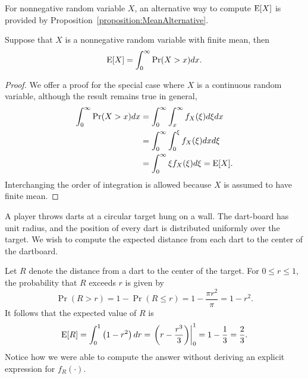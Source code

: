 For nonnegative random variable $X$, an alternative way to compute $\mathrm{E} [X]$ is provided by Proposition~\ref{proposition:MeanAlternative}. 

\begin{proposition} \label{proposition:MeanAlternative}
Suppose that $X$ is a nonnegative random variable with finite mean, then
\begin{equation*}
\mathrm{E} [X] = \int_0^{\infty} \Pr (X > x) dx .
\end{equation*}
\end{proposition}
\begin{proof}
We offer a proof for the special case where $X$ is a continuous random variable, although the result remains true in general,
\begin{equation*}
\begin{split}
\int_0^{\infty} \Pr (X > x) dx
&= \int_0^{\infty} \int_x^{\infty} f_X(\xi) d\xi dx \\
&= \int_0^{\infty} \int_0^{\xi} f_X(\xi) dx d\xi \\
&= \int_0^{\infty} \xi f_X(\xi) d\xi
= \mathrm{E} [X] .
\end{split}
\end{equation*}
Interchanging the order of integration is allowed because $X$ is assumed to have finite mean.
\end{proof}

\begin{example}
A player throws darts at a circular target hung on a wall.
The dart-board has unit radius, and the position of every dart is distributed uniformly over the target.
We wish to compute the expected distance from each dart to the center of the dartboard.

Let $R$ denote the distance from a dart to the center of the target.
For $0 \leq r \leq 1$, the probability that $R$ exceeds $r$ is given by
\begin{equation*}
\Pr (R > r) = 1 - \Pr (R \leq r) = 1 - \frac{\pi r^2}{\pi} = 1 - r^2 .
\end{equation*}
It follows that the expected value of $R$ is
\begin{equation*}
\mathrm{E} [R] = \int_0^1 \left( 1 - r^2 \right) dr
= \left.  \left( r - \frac{r^3}{3} \right) \right|_0^1
= 1 - \frac{1}{3} = \frac{2}{3} .
\end{equation*}
Notice how we were able to compute the answer without deriving an explicit expression for $f_R (\cdot)$.
\end{example}


